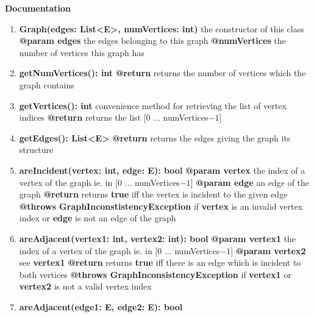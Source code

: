 	\textbf{Documentation}
	\begin{enumerate}[+]
		\item{
			\textbf{Graph(edges: List<E>, numVertices: int)} \newline
			the constructor of this class \newline
			\textbf{@param edges} the edges belonging to this graph
			\textbf{@numVertices} the number of vertices this graph has
		}
		\item{
			\textbf{getNumVertices(): int} \newline
			\textbf{@return} returns the number of vertices which the graph contains
		}
		\item{
			\textbf{getVertices(): int} \newline
			convenience method for retrieving the list of vertex indices \newline
			\textbf{@return} returns the list [0 ... numVertices$-1$]
		}
		\item{
			\textbf{getEdges(): List<E>} \newline
			\textbf{@return} returns the edges giving the graph its structure
		}
		\item{
			\textbf{areIncident(vertex: int, edge: E): bool} \newline
			\textbf{@param vertex} the index of a vertex of the graph ie. in [0 ... numVertices$-1$]\newline
			\textbf{@param edge} an edge of the graph \newline 
			\textbf{@return} returns \textbf{true} iff the vertex is incident to the given edge \newline
			\textbf{@throws GraphInconstistencyException} if \textbf{vertex} is an invalid vertex index or \textbf{edge} is not an edge of the graph
		}
		\item{
			\textbf{areAdjacent(vertex1: int, vertex2: int): bool} \newline
			\textbf{@param vertex1} the index of a vertex of the graph ie. in [0 ... numVertices$-1$] \newline
			\textbf{@param vertex2} see \textbf{vertex1} \newline
			\textbf{@return} returns \textbf{true} iff there is an edge which is incident to both vertices \newline
			\textbf{@throws GraphInconsistencyException} if \textbf{vertex1} or \textbf{vertex2} is not a valid vertex index
		}
		\item{
			\textbf{areAdjacent(edge1: E, edge2: E): bool} \newline
}
\end{enumerate}
